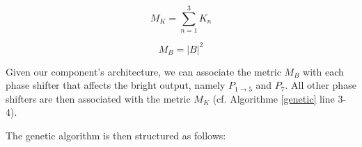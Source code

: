 \documentclass{aa}
\begin{document}
            \begin{equation}
                M_K = \sum_{n=1}^3 K_n
            \end{equation}

            \begin{equation}
                M_B = |B|^2
            \end{equation}
            
            Given our component's architecture, we can associate the metric $M_B$ with each phase shifter that affects the bright output, namely $P_{1 \rightarrow 5}$ and $P_7$. All other phase shifters are then associated with the metric $M_K$ (cf. Algorithme \ref{genetic} line 3-4).

            The genetic algorithm is then structured as follows:
\end{document}
